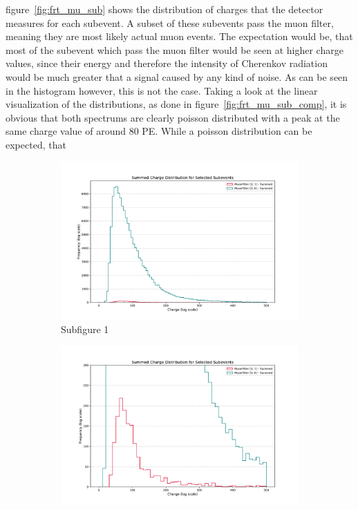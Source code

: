 figure~\ref{fig:frt_mu_sub} shows the distribution of charges that the detector measures for each subevent. A subset of these subevents pass the muon filter, 
meaning they are most likely actual muon events. The expectation would be, that most of the subevent which pass the muon filter would be seen at higher charge values,
since their energy and therefore the intensity of Cherenkov radiation would be much greater that a signal caused by any kind of noise. As can be seen in the 
histogram however, this is not the case. Taking a look at the linear visualization of the distributions, as done in figure~\ref{fig:frt_mu_sub_comp}, it is obvious that 
both spectrums are clearly poisson distributed with a peak at the same charge value of around 80 PE. While a poisson distribution can be expected, that
\begin{figure}[H] %
    \centering
    \begin{subfigure}{0.49\textwidth}
        \centering
        \includegraphics[width=\textwidth]{Plots/frt_muon_filter_sub_lin.pdf}
        \caption{Subfigure 1}
        \label{fig:sub1}
    \end{subfigure}
    \hfill %
    \begin{subfigure}{0.49\textwidth}
        \centering
        \includegraphics[width=\textwidth]{Plots/frt_muon_filter_sub_mod1.pdf}

\end{subfigure}
\end{figure}
